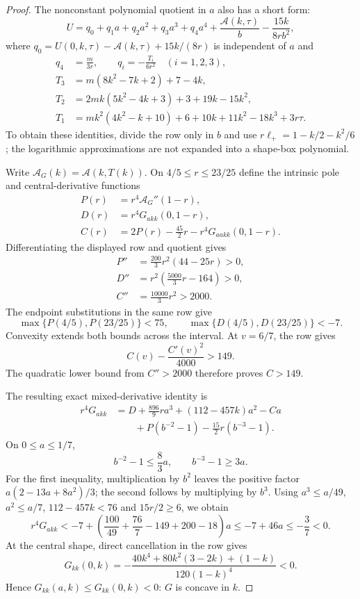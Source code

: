 \begin{proof}
The nonconstant polynomial quotient in $a$ also has a short form:
\begin{equation}\label{eq:fwd-sigma-upper-natural-quotient}
 U=q_0+q_1a+q_2a^2+q_3a^3+q_4a^4
       +\frac{\mathcal A(k,\tau)}b-\frac{15k}{8rb^2},
\end{equation}
where $q_0=U(0,k,\tau)-\mathcal A(k,\tau)+15k/(8r)$ is independent of $a$ and
\begin{align*}
 q_4&=\frac m{3r},\qquad q_i=-\frac{T_i}{6r^2}\quad(i=1,2,3),\\
 T_3&=m(8k^2-7k+2)+7-4k,\\
 T_2&=2mk(5k^2-4k+3)+3+19k-15k^2,\\
 T_1&=mk^2(4k^2-k+10)+6+10k+11k^2-18k^3+3r\tau.
\end{align*}
To obtain these identities, divide the row only in $b$ and use
$r\ell_+=1-k/2-k^2/6$; the logarithmic approximations are not expanded
into a shape-box polynomial.

Write $\mathcal A_G(k)=\mathcal A(k,T(k))$. On $4/5\leq r\leq23/25$ define the
intrinsic pole and central-derivative functions
\begin{align*}
 P(r)&=r^4\mathcal A_G''(1-r),\\
 D(r)&=r^4G_{akk}(0,1-r),\\
 C(r)&=2P(r)-\frac{45}2r-r^4G_{aakk}(0,1-r).
\end{align*}
Differentiating the displayed row and quotient gives
\begin{align*}
 P''&=\frac{200}3r^2(44-25r)>0,\\
 D''&=r^2\left(\frac{5000}3r-164\right)>0,\\
 C''&=\frac{10000}3r^2>2000.
\end{align*}
The endpoint substitutions in the same row give
\[
 \max\{P(4/5),P(23/25)\}<75,\qquad
 \max\{D(4/5),D(23/25)\}<-7.
\]
Convexity extends both bounds across the interval. At $v=6/7$, the row gives
\[
 C(v)-\frac{C'(v)^2}{4000}>149.
\]
The quadratic lower bound from $C''>2000$ therefore proves $C>149$.

The resulting exact mixed-derivative identity is
\begin{align*}
 r^4G_{akk}
 &=D+\frac{896}9ra^3+(112-457k)a^2-Ca\\
 &\qquad+P(b^{-2}-1)-\frac{15}2r(b^{-3}-1).
\end{align*}
On $0\leq a\leq1/7$,
\[
 b^{-2}-1\leq\frac83a,\qquad b^{-3}-1\geq3a.
\]
For the first inequality, multiplication by $b^2$ leaves the positive
factor $a(2-13a+8a^2)/3$; the second follows by multiplying by $b^3$.
Using $a^3\leq a/49$, $a^2\leq a/7$, $112-457k<76$ and
$15r/2\geq6$, we obtain
\[
 r^4G_{akk}<-7+
 \left(\frac{100}{49}+\frac{76}7-149+200-18\right)a
 \leq-7+46a\leq-\frac37<0.
\]
At the central shape, direct cancellation in the row gives
\[
 G_{kk}(0,k)=
 -\frac{40k^4+80k^2(3-2k)+(1-k)}{120(1-k)^4}<0.
\]
Hence $G_{kk}(a,k)\leq G_{kk}(0,k)<0$: $G$ is concave in $k$.


\end{proof}
